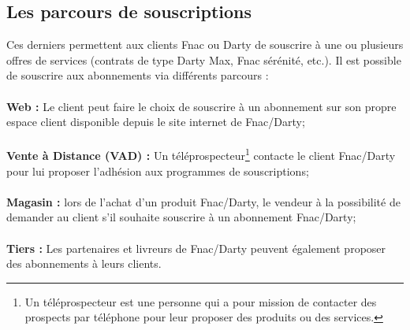 \documentclass[12pt, a4paper]{report}
\begin{document}
	\subsection{Les parcours de souscriptions} 
	
	Ces derniers permettent aux clients Fnac ou Darty de souscrire à une ou plusieurs offres de services (contrats de type Darty Max, Fnac sérénité, etc.). Il est possible de souscrire aux abonnements via différents parcours : 
	\\\\
	\textbf{Web :} Le client peut faire le choix de souscrire à un abonnement sur son propre espace client disponible depuis le site internet de Fnac/Darty;
	\\\\
	\textbf{Vente à Distance (VAD) :} Un téléprospecteur\footnote{Un téléprospecteur est une personne qui a pour mission de contacter des prospects par téléphone pour leur proposer des produits ou des services.} contacte le client Fnac/Darty pour lui proposer l'adhésion aux programmes de souscriptions;
	\\\\
	\textbf{Magasin :} lors de l'achat d'un produit Fnac/Darty, le vendeur à la possibilité de demander au client s'il souhaite souscrire à un abonnement Fnac/Darty;
	\\\\
	\textbf{Tiers :} Les partenaires et livreurs de Fnac/Darty peuvent également proposer des abonnements à leurs clients.

	\vspace{1cm}
\end{document}
